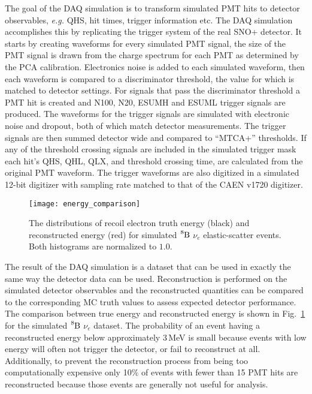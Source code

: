 The goal of the DAQ simulation is to transform simulated PMT hits to detector observables,
\textit{e.g.} QHS, hit times, trigger information etc.
The DAQ simulation accomplishes this by replicating the trigger system of the real SNO+ detector.
It starts by creating waveforms for every simulated PMT signal, the size
of the PMT signal is drawn from the charge spectrum for each PMT as determined
by the PCA calibration.
Electronics noise is added to each simulated waveform, then each waveform is compared to a discriminator
threshold, the value for which is matched to detector settings.
For signals that pass the discriminator threshold a PMT hit is created
and N100, N20, ESUMH and ESUML trigger signals are produced.
The waveforms for the trigger signals are simulated with electronic noise and dropout, both
of which match detector measurements.
The trigger signals are then summed detector wide and compared to ``MTCA+'' thresholds.
If any of the threshold crossing signals are included in the simulated trigger mask
each hit's  QHS, QHL, QLX, and threshold crossing time, are calculated from the original PMT waveform.
The trigger waveforms are also digitized in a simulated 12-bit digitizer with sampling rate matched
to that of the CAEN v1720 digitizer.

\begin{figure}[htbp]
  \centering
  \texttt{[image: energy\_comparison]}
  \caption[Reconstructed Energy Vs True Energy]{ The distributions of recoil
  electron truth energy (black) and reconstructed energy (red) for simulated
  $\ce{^{8}B}$ $\nu_{e}$ elastic-scatter events. Both histograms are normalized to $1.0$.} %
  \label{fig:energy_comparison}
\end{figure}

The result of the DAQ simulation is a dataset that can be used in exactly the same way the
detector data can be used.
Reconstruction is performed on the simulated detector observables 
 and the reconstructed quantities can be compared
to the corresponding MC truth values to assess expected detector performance.
The comparison between true energy and reconstructed energy is shown in
Fig.~\ref{fig:energy_comparison} for the simulated $\ce{^{8}B}$ $\nu_{e}$
dataset.
The probability of an event having a reconstructed energy below approximately 3\,MeV
is small because events with low energy will often not trigger the detector, or
fail to reconstruct at all.
Additionally, to prevent the reconstruction process from being too computationally expensive
only 10\% of events with fewer than 15 PMT hits are reconstructed because
those events are generally not useful for analysis.

